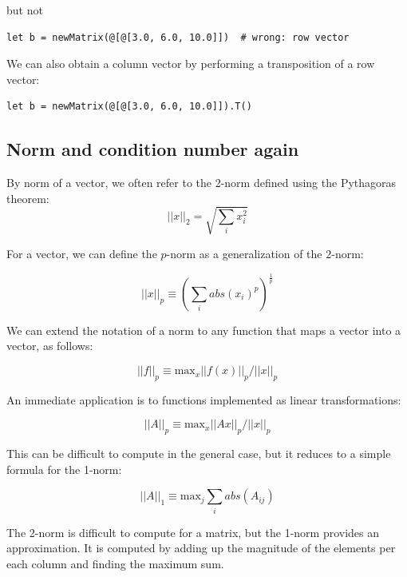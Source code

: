 \documentclass[justified, sixbynine]{tufte-book}
\theoremstyle{plain}%
\newtheorem * {corollary}{Corollary}
\theoremstyle{definition}
\theoremstyle{remark}
\newtheorem * {remark}{Remark}
\newtheorem * {note}{Note}
\begin{document}
\begin{fullwidth}
but not

\begin{lstlisting}
let b = newMatrix(@[@[3.0, 6.0, 10.0]])  # wrong: row vector
\end{lstlisting}

We can also obtain a column vector by performing a transposition of a row vector:

\begin{lstlisting}
let b = newMatrix(@[@[3.0, 6.0, 10.0]]).T()
\end{lstlisting}

\goodbreak\subsection{Norm and condition number again}


By norm of a vector, we often refer to the 2-norm defined using the Pythagoras theorem:
\begin{equation}
||x||_2 = \sqrt{\sum_i x_i^2}
\end{equation}

For a vector, we can define the $p$-norm as a generalization of the $2$-norm:

\begin{equation}
||x||_p \equiv \left(\sum_i abs(x_i)^p \right)^{\frac1p}
\end{equation}

We can extend the notation of a norm to any function that maps a vector into a vector, as follows:

\begin{equation}
||f||_p \equiv \textrm{max}_x ||f(x)||_p / ||x||_p
\end{equation}

An immediate application is to functions implemented as linear transformations:

\begin{equation}
||A||_p \equiv \textrm{max}_x ||Ax||_p / ||x||_p
\end{equation}

This can be difficult to compute in the general case, but it reduces to a simple formula for the 1-norm:

\begin{equation}
||A||_1 \equiv \textrm{max}_j \sum_i abs(A_{ij})
\end{equation}

The 2-norm is difficult to compute for a matrix, but the 1-norm provides an approximation. It is computed by adding up the magnitude of the elements per each column and finding the maximum sum.


\end{fullwidth}
\end{document}
